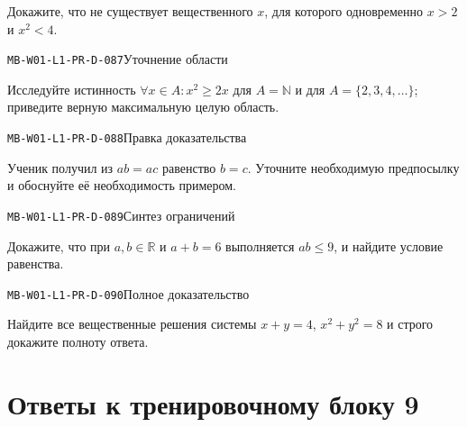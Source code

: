\documentclass[11pt,a4paper,openany]{book}
\newcommand{\muid}[1]{\texttt{\footnotesize #1}}
\renewcommand{\arraystretch}{1.38}
\begin{document}
Докажите, что не существует вещественного $x$, для которого одновременно $x>2$ и $x^2<4$.\par\medskip

\noindent\hypertarget{MB-W01-L1-PR-D-087}{}\muid{MB-W01-L1-PR-D-087}\quad Уточнение области\par

Исследуйте истинность $\forall x\in A\colon x^2\ge2x$ для $A=\mathbb N$ и для $A=\{2,3,4,\ldots\}$; приведите верную максимальную целую область.\par\medskip

\noindent\hypertarget{MB-W01-L1-PR-D-088}{}\muid{MB-W01-L1-PR-D-088}\quad Правка доказательства\par

Ученик получил из $ab=ac$ равенство $b=c$. Уточните необходимую предпосылку и обоснуйте её необходимость примером.\par\medskip

\noindent\hypertarget{MB-W01-L1-PR-D-089}{}\muid{MB-W01-L1-PR-D-089}\quad Синтез ограничений\par

Докажите, что при $a,b\in\mathbb R$ и $a+b=6$ выполняется $ab\le9$, и найдите условие равенства.\par\medskip

\noindent\hypertarget{MB-W01-L1-PR-D-090}{}\muid{MB-W01-L1-PR-D-090}\quad Полное доказательство\par

Найдите все вещественные решения системы $x+y=4$, $x^2+y^2=8$ и строго докажите полноту ответа.\par\medskip

\clearpage\section*{Ответы к тренировочному блоку 9}


\begingroup\footnotesize\renewcommand{\arraystretch}{1.45}
\end{document}
